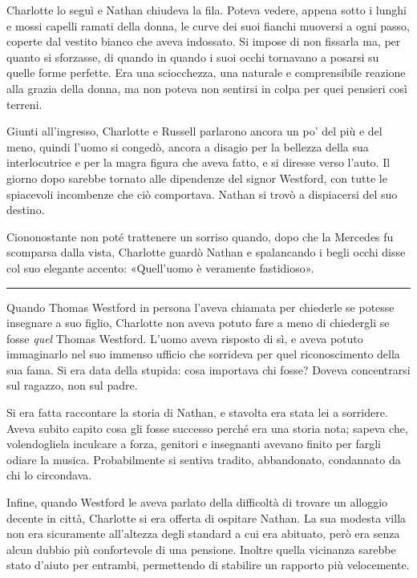 \documentclass[a4paper,oneside,10pt]{memoir}
\begin{document}
Charlotte lo seguì e Nathan chiudeva la fila. Poteva vedere, appena sotto i lunghi e mossi capelli ramati della donna,
le curve dei suoi fianchi muoversi a ogni passo, coperte dal vestito bianco che aveva indossato. Si impose di non
fissarla ma, per quanto si sforzasse, di quando in quando i suoi occhi tornavano a posarsi su quelle forme perfette. Era
una sciocchezza, una naturale e comprensibile reazione alla grazia della donna, ma non poteva non sentirsi in colpa per
quei pensieri così terreni.

Giunti all'ingresso, Charlotte e Russell parlarono ancora un po' del più e del meno, quindi l'uomo si congedò, ancora
a disagio per la bellezza della sua interlocutrice e per la magra figura che aveva fatto, e si diresse verso l'auto. Il
giorno dopo sarebbe tornato alle dipendenze del signor Westford, con tutte le spiacevoli incombenze che ciò comportava.
Nathan si trovò a dispiacersi del suo destino.

Ciononostante non poté trattenere un sorriso quando, dopo che la Mercedes fu scomparsa dalla vista, Charlotte guardò
Nathan e spalancando i begli occhi disse col suo elegante accento: «Quell'uomo è veramente fastidioso».

\plainbreak{1}

Quando Thomas Westford in persona l'aveva chiamata per chiederle se potesse insegnare a suo figlio, Charlotte non aveva
potuto fare a meno di chiedergli se fosse \emph{quel} Thomas Westford. L'uomo aveva risposto di sì, e aveva potuto
immaginarlo nel suo immenso ufficio che sorrideva per quel riconoscimento della sua fama. Si era data della stupida:
cosa importava chi fosse? Doveva concentrarsi sul ragazzo, non sul padre.

Si era fatta raccontare la storia di Nathan, e stavolta era stata lei a sorridere. Aveva subito capito cosa gli fosse
successo perché era una storia nota; sapeva che, volendogliela inculcare a forza, genitori e insegnanti avevano finito
per fargli odiare la musica. Probabilmente si sentiva tradito, abbandonato, condannato da chi lo circondava.

Infine, quando Westford le aveva parlato della difficoltà di trovare un alloggio decente in città, Charlotte si era
offerta di ospitare Nathan. La sua modesta villa non era sicuramente all'altezza degli standard a cui era abituato,
però era senza alcun dubbio più confortevole di una pensione. Inoltre quella vicinanza sarebbe stato d'aiuto per
entrambi, permettendo di stabilire un rapporto più velocemente.
\end{document}
